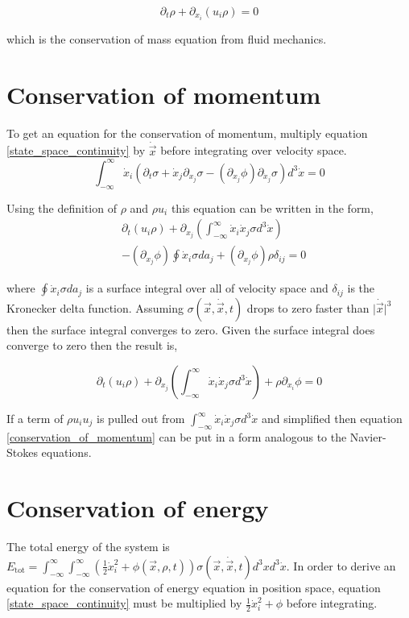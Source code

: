 \documentclass[%
 twocolumn,
 amsmath,amssymb,
 aps,
]{revtex4-1}
\newcommand{\dvec}[1]{\dot{\vec{#1}}}
\newcommand{\intVdot}[1]{\int_{-\infty}^{\infty} #1 d^3\dot{x}}
\newcommand{\intVVdot}[1]{\int_{-\infty}^{\infty}\int_{-\infty}^{\infty} #1 d^3xd^3\dot{x}}
\begin{document}
\begin{equation}
\partial_t\rho + \partial_{x_i}\left(u_i\rho\right)=0
\label{conservation_of_mass}
\end{equation}

which is the conservation of mass equation from fluid mechanics.

\section{Conservation of momentum}
To get an equation for the conservation of momentum, multiply equation \eqref{state_space_continuity} by $\dvec{x}$ before integrating over velocity space.
\[
\intVdot{\dot{x}_i\left(\partial_t \sigma + \dot{x}_j\partial_{x_j}\sigma-\left(\partial_{x_j}\phi\right)\partial_{\dot{x}_j}\sigma\right)}=0
\]

Using the definition of $\rho$ and $\rho u_i$ this equation can be written in the form,
\[
\begin{split}
& \partial_t\left(u_i\rho\right) + \partial_{x_j}\left(\intVdot{\dot{x}_i\dot{x}_j\sigma}\right) \\ & - \left(\partial_{x_j}\phi\right)\oint\dot{x}_i\sigma da_j + \left(\partial_{x_j}\phi\right)\rho\delta_{i j}=0
\end{split}
\]

where $\oint\dot{x}_i\sigma da_j$ is a surface integral over all of velocity space and $\delta_{ij}$ is the Kronecker delta function. Assuming $\sigma(\vec{x}, \dvec{x}, t)$ drops to zero faster than $\lvert\dvec{x}\rvert^3$ then the surface integral converges to zero. Given the surface integral does converge to zero then the result is,

\begin{equation}
\partial_t\left(u_i\rho\right) + \partial_{x_j}\left(\intVdot{\dot{x}_i\dot{x}_j\sigma}\right) + \rho\partial_{x_i}\phi=0
\label{conservation_of_momentum}
\end{equation}

If a term of $\rho u_i u_j$ is pulled out from $\intVdot{\dot{x}_i\dot{x}_j\sigma}$ and simplified then equation \eqref{conservation_of_momentum} can be put in a form analogous to the Navier-Stokes equations.

\section{Conservation of energy}
The total energy of the system is $E_{\text{tot}}=\intVVdot{\left(\frac{1}{2}\dot{x}_i^2 + \phi(\vec{x}, \rho, t)\right)\sigma(\vec{x}, \dvec{x}, t)}$.  In order to derive an equation for the conservation of energy equation in position space, equation \eqref{state_space_continuity} must be multiplied by $\frac{1}{2}\dot{x}_i^2 + \phi$ before integrating. 
\end{document}
